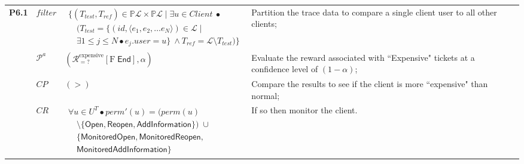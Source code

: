 \begin{landscape}
\begin{longtable}{R{0.7cm}R{0.7cm}R{7.8cm}R{12.3cm}}
	 \textbf{P6.1} & $\mathit{filter}$ & $\begin{array}{l}
	\bigl\{(T_\mathit{test},T_\mathit{ref})\in \mathbb{P}\mathcal{L}\!\times\! \mathbb{P}\mathcal{L} \mid
	\exists u\!\in\! \mathit{Client}\: \bullet \\
	\quad \bigl(T_\mathit{test} = \{ (\mathit{id},\langle e_1, e_2, \ldots e_N \rangle)\!\in\! \mathcal{L} \mid\\
	\quad \exists 1\leq j\leq N \bullet e_j.\mathit{user}=u\} \: \wedge  T_\mathit{ref} = \mathcal{L}\setminus T_\mathit{test}\bigr)\bigr\}
	\end{array}$ & Partition the trace data to compare a single client user to all other clients;\\
	& $\mathcal{P}^a$ & $(\mathcal{R}_{=?}^\mathrm{expensive}[ \mathrm{F}\; \mathsf{End}], \alpha)$ & Evaluate the reward associated with ``Expensive" tickets at a confidence level of $(1 - \alpha)$;\\
	 & $\mathit{CP}$ & $(>)$ & Compare the results to see if the client is more ``expensive" than normal;\\
	& $\mathit{CR}$ & $\begin{array}{l}
	\forall u \in U^{T} \bullet \mathit{perm}'(u) = (\mathit{perm}(u) \\
	\quad \setminus \{\mathsf{Open},  \mathsf{Reopen},\! \mathsf{AddInformation}\!\}\!) \;\cup\; \\
	\quad \{\mathsf{MonitoredOpen}, \mathsf{MonitoredReopen}, \\
	\quad \mathsf{MonitoredAddInformation}\!\}
	\end{array}$ & If so then monitor the client.\\ \hline
	

\end{longtable}
\end{landscape}
